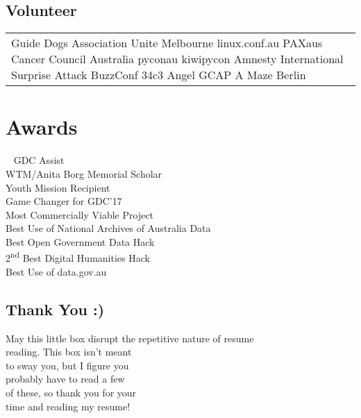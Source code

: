 \documentclass[a4paper]{deedy-resume} %
\begin{document}
\begin{minipage}[t]{0.33\textwidth}
\sectionspace
\subsection{Volunteer}
\begin{tabular}{p{}}
\textbullet{} Guide Dogs Association \textbullet{} Unite Melbourne
\textbullet{} linux.conf.au  \textbullet{} PAXaus
\textbullet{} Cancer Council Australia  \textbullet{} pyconau
\textbullet{} kiwipycon \textbullet{} Amnesty International
\textbullet{} Surprise Attack \textbullet{} BuzzConf
\textbullet{} 34c3 Angel \textbullet{} GCAP \textbullet{} A Maze Berlin\\
\end{tabular}

\sectionspace %

\section{Awards}

\
\textbullet{} GDC Assist \\
\textbullet{}WTM/Anita Borg Memorial Scholar \\
\textbullet{}Youth Mission Recipient \\
\textbullet{}Game Changer for GDC'17 \\
\textbullet{} Most Commercially Viable Project\\
\textbullet{} Best Use of National Archives of Australia Data \\
\textbullet{} Best Open Government Data Hack \\
\textbullet{} 2\textsuperscript{nd} Best Digital Humanities Hack \\
\location{2013}
\textbullet{} Best Use of data.gov.au \\

\sectionspace %


\sectionspace
\subsection{Thank You :)}
May this little box disrupt the repetitive nature of resume \\
reading. This box isn't meant \\
to sway you, but I figure you \\
probably have to read a few \\
of these, so thank you for your \\
time and reading my resume!

\end{minipage} %
\end{document}
